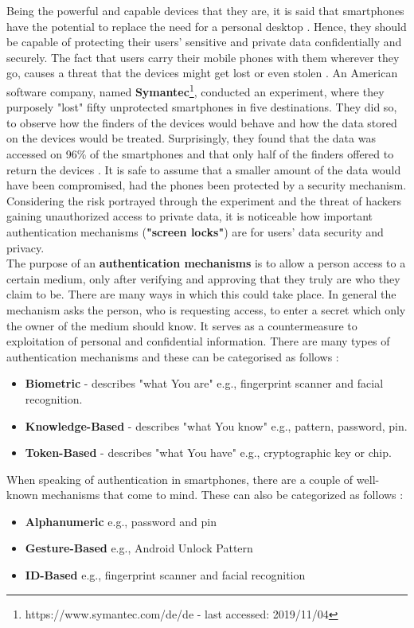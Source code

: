 Being the powerful and capable devices that they are, it is said that smartphones have the potential to replace the need for a personal desktop \cite{Alsaleh}. Hence, they should be capable of protecting their users' sensitive and private data confidentially and securely. The fact that users carry their mobile phones with them wherever they go, causes a threat that the devices might get lost or even stolen \cite{Egelman:2014:YRL:2660267.2660273}. An American software company, named \textbf{Symantec}\footnote{https://www.symantec.com/de/de - last accessed: 2019/11/04}, conducted an experiment, where they purposely "lost" fifty unprotected smartphones in five destinations. They did so, to observe how the finders of the devices would behave and how the data stored on the devices would be treated. Surprisingly, they found that the data was accessed on 96\% of the smartphones and that only half of the finders offered to return the devices \cite{symantec}. It is safe to assume that a smaller amount of the data would have been compromised, had the phones been protected by a security mechanism. Considering the risk portrayed through the experiment and the threat of hackers gaining unauthorized access to private data, it is noticeable how important authentication mechanisms (\textbf{"screen locks"}) are for users' data security and privacy.\\

The purpose of an \textbf{authentication mechanisms} is to allow a person access to a certain medium, only after verifying and approving that they truly are who they claim to be. There are many ways in which this could take place. In general the mechanism asks the person, who is requesting access, to enter a secret which only the owner of the medium should know. It serves as a countermeasure to exploitation of personal and confidential information. There are many types of authentication mechanisms and these can be categorised as follows \cite{gorman}:  
\begin{itemize}
    \item \textbf{Biometric} - describes "what You are" e.g., fingerprint scanner and facial recognition.
    \item \textbf{Knowledge-Based} - describes "what You know" e.g., pattern, password, pin.
    \item \textbf{Token-Based} - describes "what You have" e.g., cryptographic key or chip.
\end{itemize}


When speaking of authentication in smartphones, there are a couple of well-known mechanisms that come to mind. These can also be categorized as follows \cite{ediss20251,gorman} : 
\begin{itemize}
    \item \textbf{Alphanumeric} e.g., password and pin
    \item \textbf{Gesture-Based} e.g., Android Unlock Pattern
    \item \textbf{ID-Based} e.g., fingerprint scanner and facial recognition 
\end{itemize}

